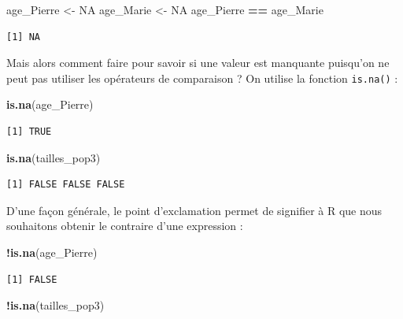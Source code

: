 \documentclass[a4paperpaper,]{article}
\newenvironment{Shaded}{\begin{snugshade}}{\end{snugshade}}
\newcommand{\KeywordTok}[1]{\textcolor[rgb]{0.13,0.29,0.53}{\textbf{#1}}}
\newcommand{\StringTok}[1]{\textcolor[rgb]{0.31,0.60,0.02}{#1}}
\newcommand{\OtherTok}[1]{\textcolor[rgb]{0.56,0.35,0.01}{#1}}
\newcommand{\OperatorTok}[1]{\textcolor[rgb]{0.81,0.36,0.00}{\textbf{#1}}}
\newcommand{\NormalTok}[1]{#1}
\theoremstyle{definition}
\theoremstyle{definition}
\theoremstyle{definition}
\theoremstyle{remark}
\begin{document}
\begin{Shaded}
\begin{Highlighting}[]
\NormalTok{age_Pierre <-}\StringTok{ }\OtherTok{NA}
\NormalTok{age_Marie <-}\StringTok{ }\OtherTok{NA}
\NormalTok{age_Pierre }\OperatorTok{==}\StringTok{ }\NormalTok{age_Marie}
\end{Highlighting}
\end{Shaded}

\begin{verbatim}
[1] NA
\end{verbatim}

Mais alors comment faire pour savoir si une valeur est manquante
puisqu'on ne peut pas utiliser les opérateurs de comparaison ? On
utilise la fonction \texttt{is.na()} :

\begin{Shaded}
\begin{Highlighting}[]
\KeywordTok{is.na}\NormalTok{(age_Pierre)}
\end{Highlighting}
\end{Shaded}

\begin{verbatim}
[1] TRUE
\end{verbatim}

\begin{Shaded}
\begin{Highlighting}[]
\KeywordTok{is.na}\NormalTok{(tailles_pop3)}
\end{Highlighting}
\end{Shaded}

\begin{verbatim}
[1] FALSE FALSE FALSE
\end{verbatim}

D'une façon générale, le point d'exclamation permet de signifier à R que
nous souhaitons obtenir le contraire d'une expression :

\begin{Shaded}
\begin{Highlighting}[]
\OperatorTok{!}\KeywordTok{is.na}\NormalTok{(age_Pierre)}
\end{Highlighting}
\end{Shaded}

\begin{verbatim}
[1] FALSE
\end{verbatim}

\begin{Shaded}
\begin{Highlighting}[]
\OperatorTok{!}\KeywordTok{is.na}\NormalTok{(tailles_pop3)}
\end{Highlighting}
\end{Shaded}
\end{document}
